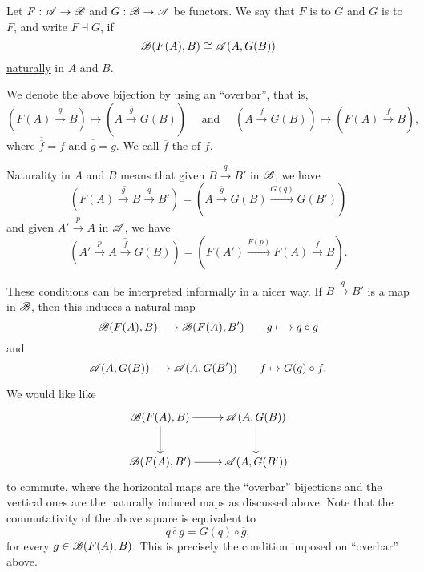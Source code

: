 \begin{definition}
    Let $F:\mathscr A\to\mathscr B$ and $G:\mathscr B\to\mathscr A$ be functors. We say that $F$ is  to $G$ and $G$ is  to $F$, and write $F\dashv G$, if 
    \begin{equation*}
        \mathscr B(F(A), B)\cong\mathscr A(A, G(B))
    \end{equation*}
    \underline{naturally} in $A$ and $B$.
\end{definition}

We denote the above bijection by using an ``overbar'', that is, 
\begin{equation*}
    \left(F(A)\xrightarrow{g} B\right)\mapsto\left(A\xrightarrow{\overline g} G(B)\right)\quad\text{ and }\quad\left(A\xrightarrow{f}G(B)\right)\mapsto\left(F(A)\xrightarrow{\overline f} B\right),
\end{equation*}
where $\overline{\overline f} = f$ and $\overline{\overline g} = g$. We call $\overline f$ the  of $f$.

Naturality in $A$ and $B$ means that given $B\xrightarrow{q} B'$ in $\mathscr B$, we have 
\begin{equation*}
    \overline{\left(F(A)\xrightarrow{g} B\xrightarrow{q}B'\right)} = \left(A\xrightarrow{\overline g} G(B)\xrightarrow{G(q)} G(B')\right)
\end{equation*}
and given $A'\xrightarrow{p} A$ in $\mathscr A$, we have 
\begin{equation*}
    \overline{\left(A'\xrightarrow{p} A\xrightarrow{f} G(B)\right)} = \left(F(A')\xrightarrow{F(p)} F(A)\xrightarrow{\overline f} B\right).
\end{equation*}

These conditions can be interpreted informally in a nicer way. If $B\xrightarrow{q} B'$ is a map in $\mathscr B$, then this induces a natural map 
\begin{equation*}
    \mathscr B(F(A), B)\longrightarrow\mathscr B(F(A), B')\qquad g\longmapsto q\circ g
\end{equation*}
and 
\begin{equation*}
    \mathscr A(A, G(B))\longrightarrow\mathscr A(A, G(B'))\qquad f\mapsto G(q)\circ f.
\end{equation*}

We would like like 
\begin{equation*}
    \xymatrix {
        \scrB(F(A), B)\ar[r]\ar[d] & \scrA(A, G(B))\ar[d]\\
        \scrB(F(A), B')\ar[r] & \scrA(A, G(B'))
    }
\end{equation*}
to commute, where the horizontal maps are the ``overbar'' bijections and the vertical ones are the naturally induced maps as discussed above. Note that the commutativity of the above square is equivalent to 
\begin{equation*}
    \overline{q\circ g} = G(q)\circ\overline g,
\end{equation*}
for every $g\in\mathscr B(F(A), B)$. This is precisely the condition imposed on ``overbar'' above.

